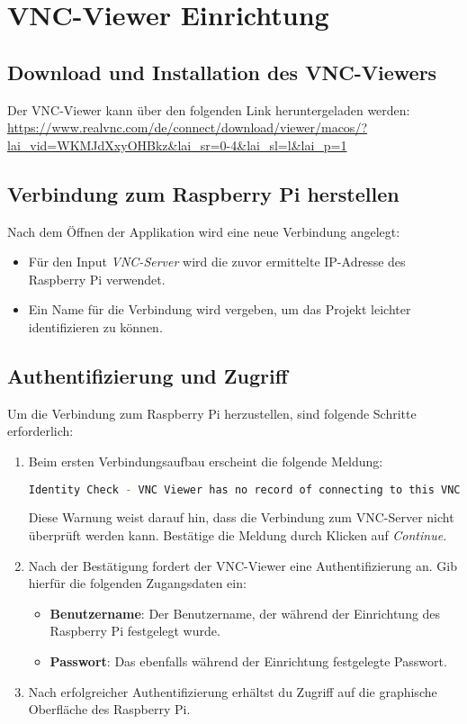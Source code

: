 \documentclass[a4paper,12pt]{article}
\begin{document}
\section{VNC-Viewer Einrichtung}
\subsection{Download und Installation des VNC-Viewers}
Der VNC-Viewer kann über den folgenden Link heruntergeladen werden:  
\url{https://www.realvnc.com/de/connect/download/viewer/macos/?lai_vid=WKMJdXxyOHBkz&lai_sr=0-4&lai_sl=l&lai_p=1}

\subsection{Verbindung zum Raspberry Pi herstellen}
Nach dem Öffnen der Applikation wird eine neue Verbindung angelegt:
\begin{itemize}
    \item Für den Input \textit{VNC-Server} wird die zuvor ermittelte IP-Adresse des Raspberry Pi verwendet.
    \item Ein Name für die Verbindung wird vergeben, um das Projekt leichter identifizieren zu können.
\end{itemize}

\subsection{Authentifizierung und Zugriff}
Um die Verbindung zum Raspberry Pi herzustellen, sind folgende Schritte erforderlich:

\begin{enumerate}
    \item Beim ersten Verbindungsaufbau erscheint die folgende Meldung:
    \begin{lstlisting}[language=bash]
Identity Check - VNC Viewer has no record of connecting to this VNC Server,so its identity cannot be checked.
    \end{lstlisting}
    Diese Warnung weist darauf hin, dass die Verbindung zum VNC-Server nicht überprüft werden kann. Bestätige die Meldung durch Klicken auf \textit{Continue}.
  
    \item Nach der Bestätigung fordert der VNC-Viewer eine Authentifizierung an. Gib hierfür die folgenden Zugangsdaten ein:
    \begin{itemize}
        \item \textbf{Benutzername}: Der Benutzername, der während der Einrichtung des Raspberry Pi festgelegt wurde.
        \item \textbf{Passwort}: Das ebenfalls während der Einrichtung festgelegte Passwort.
    \end{itemize}
    
    \item Nach erfolgreicher Authentifizierung erhältst du Zugriff auf die graphische Oberfläche des Raspberry Pi.
\end{enumerate}
\end{document}

